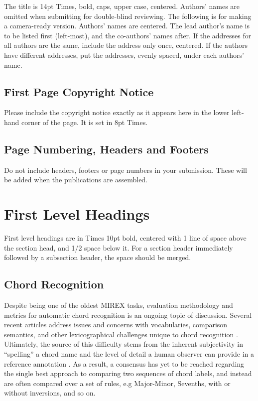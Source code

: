 \documentclass{article}
\begin{document}
The title is 14pt Times, bold, caps, upper case, centered.
Authors' names are omitted when submitting for double-blind reviewing.
The following is for making a camera-ready version.
Authors' names are centered.
The lead author's name is to be listed first (left-most), and the co-authors' names after.
If the addresses for all authors are the same, include the address only once, centered.
If the authors have different addresses, put the addresses, evenly spaced, under each authors' name.

\subsection{First Page Copyright Notice}

Please include the copyright notice exactly as it appears here in the lower left-hand corner of the page.
It is set in 8pt Times.

\subsection{Page Numbering, Headers and Footers}

Do not include headers, footers or page numbers in your submission.
These will be added when the publications are assembled.

\section{First Level Headings}

First level headings are in Times 10pt bold,
centered with 1 line of space above the section head, and 1/2 space below it.
For a section header immediately followed by a subsection header, the space should be merged.

\subsection{Chord Recognition}


Despite being one of the oldest MIREX tasks, evaluation methodology and metrics for automatic chord recognition is an ongoing topic of discussion.
Several recent articles address issues and concerns with vocabularies, comparison semantics, and other lexicographical challenges unique to chord recognition \cite{}.
Ultimately, the source of this difficulty stems from the inherent subjectivity in ``spelling'' a chord name and the level of detail a human observer can provide in a reference annotation \cite{McVicar}.
As a result, a consensus has yet to be reached regarding the single best approach to comparing two sequences of chord labels, and instead are often compared over a set of rules, e.g Major-Minor, Sevenths, with or without inversions, and so on.
\end{document}
